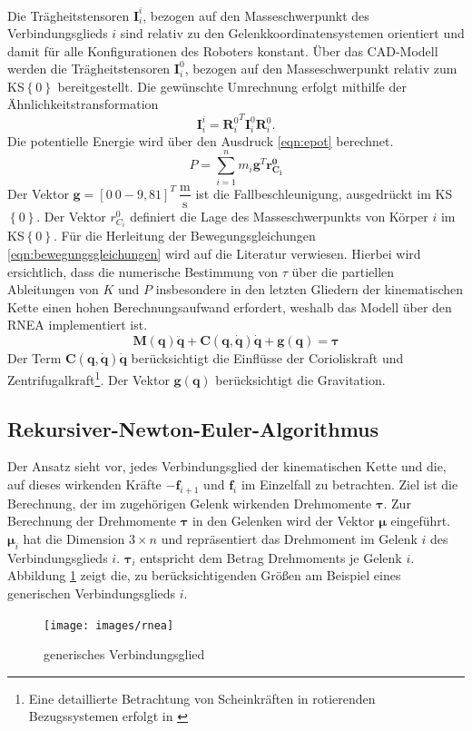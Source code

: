 Die Trägheitstensoren $\bm{I}^{i}_{i}$, bezogen auf den Masseschwerpunkt des Verbindungsglieds $i$ sind relativ zu den Gelenkkoordinatensystemen orientiert und damit für alle Konfigurationen des Roboters konstant. 
Über das CAD-Modell werden die Trägheitstensoren $\bm{I}^{0}_{i}$, bezogen auf den Masseschwerpunkt relativ zum KS$\left\{0\right\}$ bereitgestellt. Die gewünschte Umrechnung erfolgt mithilfe der Ähnlichkeitstransformation 
%
\begin{equation}
	\label{eqn:similarity}
	\bm{I}^{i}_{i} = {\bm{R}^{0}_i}^T \bm{I}^{0}_{i} \bm{R}^0_i.
\end{equation}
%
Die potentielle Energie wird über den Ausdruck \ref{eqn:epot} berechnet.
%
\begin{equation}
	\label{eqn:epot}
	P = \sum_{i=1}^{n} m_i \bm{g}^T\bm{r^0_{C_i}}
\end{equation}
%
Der Vektor $\bm{g} = [0~0-9,81]^T~\dfrac{\text{m}}{\text{s}}$ ist die Fallbeschleunigung, ausgedrückt im KS$\left\{0\right\}$. Der Vektor $r^0_{C_i}$ definiert die Lage des Masseschwerpunkts von Körper $i$ im  KS$\left\{0\right\}$. Für die Herleitung der Bewegungsgleichungen \ref{eqn:bewegungsgleichungen} wird auf die Literatur \cite[S.~180 ff.]{Spong.2020} verwiesen. Hierbei wird ersichtlich, dass die numerische Bestimmung von $\tau$ über die partiellen Ableitungen von $K$ und $P$ insbesondere in den letzten Gliedern der kinematischen Kette einen hohen Berechnungsaufwand erfordert, weshalb das Modell über den RNEA implementiert ist. 
%
\begin{equation}
	\label{eqn:bewegungsgleichungen}
	\bm{M}(\bm{q})\ddot{\bm{q}} + \bm{C}(\bm{q},\dot{\bm{q}})\dot{\bm{q}} + \bm{g}(\bm{q}) = \bm{\tau}
\end{equation}
%
Der Term $\bm{C}(\bm{q},\dot{\bm{q}})\dot{\bm{q}}$ berücksichtigt die Einflüsse der Corioliskraft und Zentrifugalkraft\footnote{Eine detaillierte Betrachtung von Scheinkräften in rotierenden Bezugssystemen erfolgt in  \cite[S.~159]{Roth.2016}}. Der Vektor $\bm{g}(\bm{q})$ berücksichtigt die Gravitation. \cite[S.~180~ff.]{Spong.2020}
%
\subsection{Rekursiver-Newton-Euler-Algorithmus}
%
Der Ansatz sieht vor, jedes Verbindungsglied der kinematischen Kette und die, auf dieses wirkenden Kräfte $ -\boldsymbol{f}_{i+1} $ und $ \boldsymbol{f}_i $ im Einzelfall zu betrachten. Ziel ist die Berechnung, der im zugehörigen Gelenk wirkenden Drehmomente $\bm{\tau}$. Zur Berechnung der Drehmomente $\bm{\tau}$ in den Gelenken wird der Vektor $\bm{\mu}$ eingeführt. $\bm{\mu}_i$ hat die Dimension $3 \times n$ und repräsentiert das Drehmoment im Gelenk $i$ des Verbindungsglieds $i$. $\bm{\tau}_i$ entspricht dem Betrag Drehmoments je Gelenk $i$. Abbildung \ref{fig:rnea} zeigt die, zu berücksichtigenden Größen am Beispiel eines generischen Verbindungsglieds $i$.
%
\begin{figure}[tbph]
	\centering
	\texttt{[image: images/rnea]}
	\caption{generisches Verbindungsglied \cite[S.~283]{Grimble.2009}}
	\label{fig:rnea}
\end{figure} 
%
